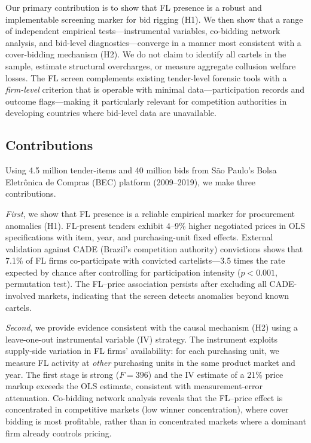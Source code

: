 \noindent Our primary contribution is to show that FL presence is a %
robust and implementable screening marker for bid rigging (H1). We then
show that a range of independent empirical tests---instrumental
variables, co-bidding network analysis, and bid-level
diagnostics---converge in a manner most consistent with a cover-bidding
mechanism (H2). We do not claim to identify all cartels in the sample,
estimate structural overcharges, or measure aggregate collusion welfare
losses. The FL screen complements existing tender-level forensic tools
\citep{imhof2019detecting} with a \emph{firm-level} criterion that is
operable with minimal data---participation records and outcome
flags---making it particularly relevant for competition authorities in
developing countries where bid-level data are unavailable.

\subsection{Contributions}

Using 4.5 million tender-items and 40 million bids from S\~ao Paulo's
Bolsa Eletr\^onica de Compras (BEC) platform (2009--2019), we make three
contributions.

\emph{First}, we show that FL presence is a reliable empirical marker %
for procurement anomalies (H1). FL-present tenders exhibit 4--9\%
higher negotiated prices in OLS specifications with item, year, and
purchasing-unit fixed effects. External validation against CADE
(Brazil's competition authority) convictions shows that 7.1\% of FL
firms co-participate with convicted cartelists---3.5 times the rate
expected by chance after controlling for participation intensity
($p < 0.001$, permutation test). The FL--price association persists
after excluding all CADE-involved markets, indicating that the screen
detects anomalies beyond known cartels.

\emph{Second}, we provide evidence consistent with the causal mechanism %
(H2) using a leave-one-out instrumental variable (IV) strategy. The
instrument exploits supply-side variation in FL firms' availability: for
each purchasing unit, we measure FL activity at \emph{other} purchasing
units in the same product market and year. The first stage is strong
($F = 396$) and the IV estimate of a 21\% price markup exceeds the OLS
estimate, consistent with measurement-error attenuation. Co-bidding
network analysis reveals that the FL--price effect is concentrated in
competitive markets (low winner concentration), where cover bidding is
most profitable, rather than in concentrated markets where a dominant
firm already controls pricing.

